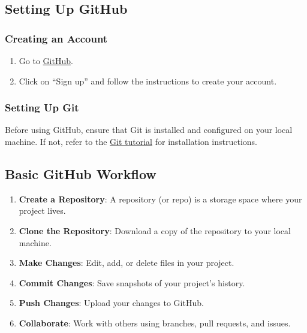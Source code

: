 \documentclass[
  letterpaper,
  DIV=11,
  numbers=noendperiod]{scrreprt}
\providecommand{\tightlist}{%
  \setlength{\itemsep}{0pt}\setlength{\parskip}{0pt}}\usepackage{longtable,booktabs,array}
\begin{document}
\subsection{Setting Up GitHub}\label{setting-up-github}

\subsubsection{Creating an Account}\label{creating-an-account}

\begin{enumerate}
\def\labelenumi{\arabic{enumi}.}
\tightlist
\item
  Go to \href{https://github.com/}{GitHub}.
\item
  Click on ``Sign up'' and follow the instructions to create your
  account.
\end{enumerate}

\subsubsection{Setting Up Git}\label{setting-up-git-1}

Before using GitHub, ensure that Git is installed and configured on your
local machine. If not, refer to the
\href{https://git-scm.com/book/en/v2/Getting-Started-Installing-Git}{Git
tutorial} for installation instructions.

\subsection{Basic GitHub Workflow}\label{basic-github-workflow}

\begin{enumerate}
\def\labelenumi{\arabic{enumi}.}
\tightlist
\item
  \textbf{Create a Repository}: A repository (or repo) is a storage
  space where your project lives.
\item
  \textbf{Clone the Repository}: Download a copy of the repository to
  your local machine.
\item
  \textbf{Make Changes}: Edit, add, or delete files in your project.
\item
  \textbf{Commit Changes}: Save snapshots of your project's history.
\item
  \textbf{Push Changes}: Upload your changes to GitHub.
\item
  \textbf{Collaborate}: Work with others using branches, pull requests,
  and issues.
\end{enumerate}
\end{document}
